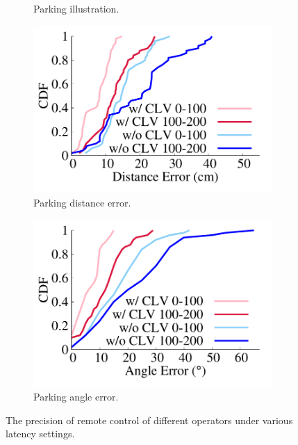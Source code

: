 \begin{figure}[ht]
\begin{subfigure}[t]{0.26\textwidth}
    \caption{Parking illustration.}
    \label{consistent:illustration}
  \end{subfigure}%
  \begin{subfigure}[t]{0.26\textwidth}
    \includegraphics[width=\linewidth]{Figs/RTDrive/evaluation/Distance.pdf}
    \caption{Parking distance error.}
    \label{consistent:distance}
  \end{subfigure}%
  \begin{subfigure}[t]{0.26\textwidth}
    \includegraphics[width=\linewidth]{Figs/RTDrive/evaluation/Angle.pdf}
    \caption{Parking angle error.}
    \label{consistent:angle}
  \end{subfigure}%
  \caption{The precision of remote control of different operators under 
various latency settings.}
  \label{feasibility}
  \vspace{-0.2cm}
\end{figure}


